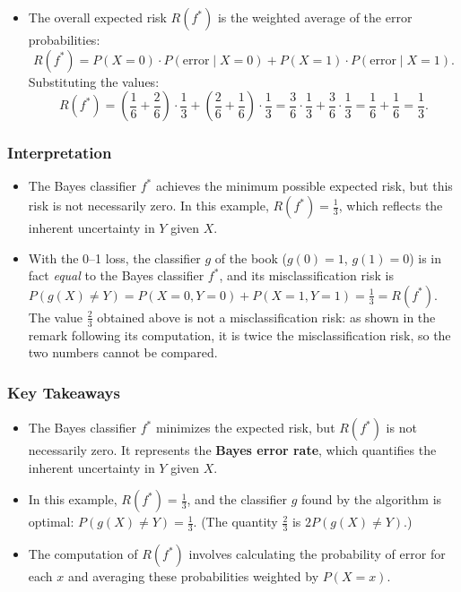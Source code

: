 \begin{notechapter}
\begin{itemize}
    \item The overall expected risk \( R(f^*) \) is the weighted average of the error probabilities:
      \[
      R(f^*) = P(X = 0) \cdot P(\text{error} \mid X = 0) + P(X = 1) \cdot P(\text{error} \mid X = 1).
      \]
      Substituting the values:
      \[
      R(f^*) = \left( \frac{1}{6} + \frac{2}{6} \right) \cdot \frac{1}{3} + \left( \frac{2}{6} + \frac{1}{6} \right) \cdot \frac{1}{3} = \frac{3}{6} \cdot \frac{1}{3} + \frac{3}{6} \cdot \frac{1}{3} = \frac{1}{6} + \frac{1}{6} = \frac{1}{3}.
      \]
\end{itemize}

\subsubsection{Interpretation}
\begin{itemize}
    \item The Bayes classifier \( f^* \) achieves the minimum possible expected risk, but this risk is not necessarily zero. In this example, \( R(f^*) = \frac{1}{3} \), which reflects the inherent uncertainty in \( Y \) given \( X \).
    \item With the 0--1 loss, the classifier \( g \) of the book (\( g(0) = 1 \), \( g(1) = 0 \)) is in fact \emph{equal} to the Bayes classifier \( f^* \), and its misclassification risk is \( P(g(X) \neq Y) = P(X=0,Y=0) + P(X=1,Y=1) = \frac{1}{3} = R(f^*) \). The value \( \frac{2}{3} \) obtained above is not a misclassification risk: as shown in the remark following its computation, it is twice the misclassification risk, so the two numbers cannot be compared.
\end{itemize}

\subsubsection{Key Takeaways}
\begin{itemize}
    \item The Bayes classifier \( f^* \) minimizes the expected risk, but \( R(f^*) \) is not necessarily zero. It represents the \textbf{Bayes error rate}, which quantifies the inherent uncertainty in \( Y \) given \( X \).
    \item In this example, \( R(f^*) = \frac{1}{3} \), and the classifier \( g \) found by the algorithm is optimal: \( P(g(X)\neq Y) = \frac{1}{3} \). (The quantity \( \frac{2}{3} \) is \( 2P(g(X)\neq Y) \).)
    \item The computation of \( R(f^*) \) involves calculating the probability of error for each \( x \) and averaging these probabilities weighted by \( P(X = x) \).
\end{itemize}


\end{notechapter}
